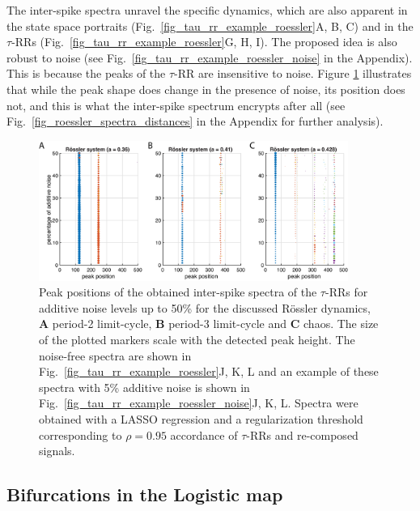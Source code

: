 \documentclass[entropy,article,submit,pdftex,moreauthors]{Definitions/mdpi}
\begin{document}
The inter-spike spectra unravel the specific dynamics, which are also apparent in the state space portraits (Fig.~\ref{fig_tau_rr_example_roessler}A, B, C) and in the 
$\tau$-RRs (Fig.~\ref{fig_tau_rr_example_roessler}G, H, I). The proposed idea is also 
robust to noise (see Fig.~\ref{fig_tau_rr_example_roessler_noise} in the Appendix). This is because the peaks of the $\tau$-RR are insensitive to noise. 
Figure \ref{fig_roessler_peaks} illustrates that 
while the peak shape does change in the presence of noise, its position does not, and this is what the inter-spike spectrum encrypts after all 
(see Fig.~\ref{fig_roessler_spectra_distances} in the Appendix for further analysis).

\begin{figure}
 \centering
 \includegraphics[width=0.9\textwidth]{./figures/fig_roessler_different_noise_levels_peaks}
 \caption{Peak positions of the obtained inter-spike spectra of the $\tau$-RRs for additive noise levels up to 50\% for the discussed R\"ossler dynamics, 
 \textbf{A} period-2 limit-cycle, \textbf{B} period-3 limit-cycle and \textbf{C} chaos. The size of the plotted markers scale with the detected peak height. The noise-free spectra are shown in Fig.~\ref{fig_tau_rr_example_roessler}J, K, L and 
 an example of these spectra with 5\% additive noise is shown in Fig.~\ref{fig_tau_rr_example_roessler_noise}J, K, L. Spectra were obtained with a LASSO regression and a regularization threshold 
  corresponding to $\rho=0.95$ accordance of $\tau$-RRs and re-composed signals.}
\label{fig_roessler_peaks}
\end{figure}


\subsection{Bifurcations in the Logistic map}
\end{document}

